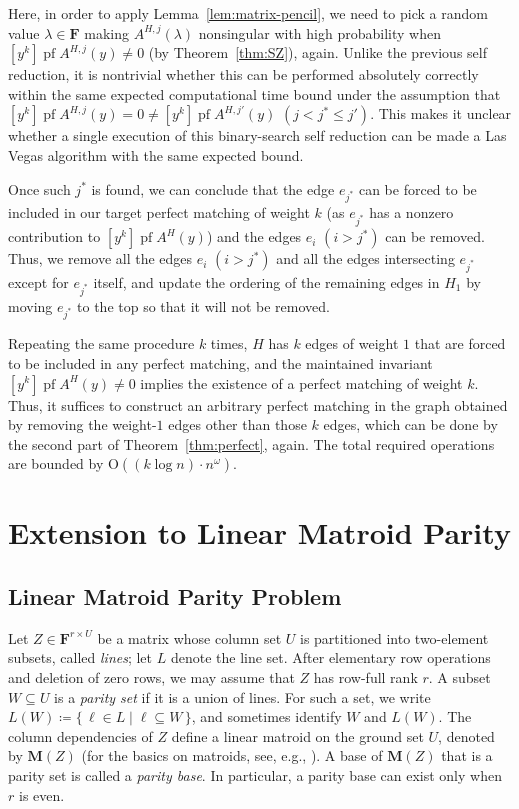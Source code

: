 \documentclass[11pt, a4paper]{article}
\theoremstyle{plain}
\theoremstyle{definition}
\theoremstyle{remark}
\newcommand{\bF}{\mathbf{F}}
\newcommand{\bM}{\mathbf{M}}
\DeclareMathOperator{\pf}{pf}
\begin{document}
Here, in order to apply Lemma~\ref{lem:matrix-pencil}, we need to pick a random value $\lambda \in \bF$ making $A^{H, j}(\lambda)$ nonsingular with high probability when $[y^k]\pf A^{H, j}(y) \neq 0$ (by Theorem~\ref{thm:SZ}), again.
Unlike the previous self reduction, it is nontrivial whether this can be performed absolutely correctly within the same expected computational time bound under the assumption that $[y^k]\pf A^{H, j}(y) = 0 \neq [y^k]\pf A^{H,j'}(y)$ $(j < j^* \le j')$.
This makes it unclear whether a single execution of this binary-search self reduction can be made a Las Vegas algorithm with the same expected bound.

Once such $j^*$ is found, we can conclude that the edge $e_{j^*}$ can be forced to be included in our target perfect matching of weight $k$ (as $e_{j^*}$ has a nonzero contribution to $[y^k]\pf A^H(y)$) and the edges $e_i$ $(i > j^*)$ can be removed.
Thus, we remove all the edges $e_i$ $(i > j^*)$ and all the edges intersecting $e_{j^*}$ except for $e_{j^*}$ itself, and update the ordering of the remaining edges in $H_1$ by moving $e_{j^*}$ to the top so that it will not be removed.

Repeating the same procedure $k$ times, $H$ has $k$ edges of weight $1$ that are forced to be included in any perfect matching, and the maintained invariant $[y^k]\pf A^H(y) \neq 0$ implies the existence of a perfect matching of weight $k$.
Thus, it suffices to construct an arbitrary perfect matching in the graph obtained by removing the weight-$1$ edges other than those $k$ edges, which can be done by the second part of Theorem~\ref{thm:perfect}, again.
The total required operations are bounded by $\mathrm{O}((k\log n) \cdot n^\omega)$.



\section{Extension to Linear Matroid Parity}\label{sec:LMP}
\subsection{Linear Matroid Parity Problem}
Let $Z\in\bF^{r\times U}$ be a matrix whose column set $U$ is partitioned into two-element subsets, called \emph{lines}; let $L$ denote the line set.
After elementary row operations and deletion of zero rows, we may assume that $Z$ has row-full rank $r$.
A subset $W\subseteq U$ is a \emph{parity set} if it is a union of lines.
For such a set, we write $L(W)\coloneqq\{\,\ell\in L \mid \ell\subseteq W\,\}$, and sometimes identify $W$ and $L(W)$.
The column dependencies of $Z$ define a linear matroid on the ground set $U$, denoted by $\bM(Z)$ (for the basics on matroids, see, e.g., \cite{Schrijver2003}).
A base of $\bM(Z)$ that is a parity set is called a \emph{parity base}.
In particular, a parity base can exist only when $r$ is even.
\end{document}
